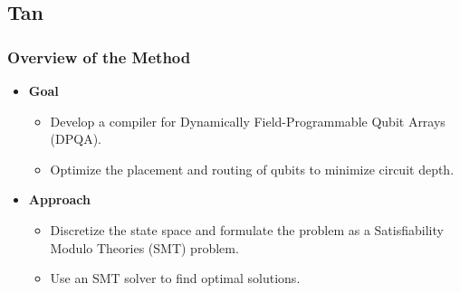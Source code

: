 \documentclass[18 pt]{beamer}
\begin{document}
\subsection{Tan}
\begin{frame}
    \frametitle{Overview of the Method}
    \begin{itemize}
        \item \textbf{Goal}
        \begin{itemize}
            \item Develop a compiler for Dynamically Field-Programmable Qubit Arrays (DPQA).
            \item Optimize the placement and routing of qubits to minimize circuit depth.
        \end{itemize}
        \item \textbf{Approach}
        \begin{itemize}
            \item Discretize the state space and formulate the problem as a Satisfiability Modulo Theories (SMT) problem.
            \item Use an SMT solver to find optimal solutions.
        \end{itemize}
    \end{itemize}
\end{frame}
\end{document}
